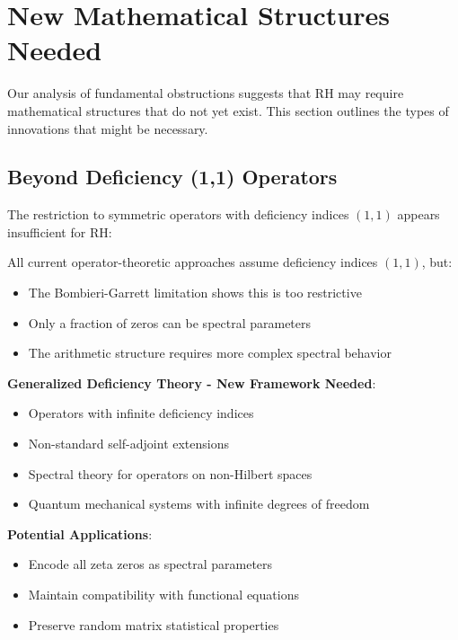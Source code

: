 \section{New Mathematical Structures Needed}
\label{sec:new_structures}

Our analysis of fundamental obstructions suggests that RH may require mathematical structures that do not yet exist. This section outlines the types of innovations that might be necessary.

\subsection{Beyond Deficiency (1,1) Operators}
\label{subsec:beyond_deficiency}

The restriction to symmetric operators with deficiency indices $(1,1)$ appears insufficient for RH:

\begin{problem}
All current operator-theoretic approaches assume deficiency indices $(1,1)$, but:
\begin{itemize}
\item The Bombieri-Garrett limitation shows this is too restrictive
\item Only a fraction of zeros can be spectral parameters
\item The arithmetic structure requires more complex spectral behavior
\end{itemize}
\end{problem}

\noindent\textbf{Generalized Deficiency Theory - New Framework Needed}:
\begin{itemize}
\item Operators with infinite deficiency indices
\item Non-standard self-adjoint extensions
\item Spectral theory for operators on non-Hilbert spaces
\item Quantum mechanical systems with infinite degrees of freedom
\end{itemize}

\textbf{Potential Applications}:
\begin{itemize}
\item Encode all zeta zeros as spectral parameters
\item Maintain compatibility with functional equations
\item Preserve random matrix statistical properties
\end{itemize}

